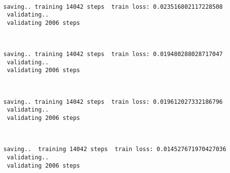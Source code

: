 \documentclass[11pt]{article}
\begin{document}
    \begin{center}
    \end{center}
    { \hspace*{\fill} \\}
    
    \begin{Verbatim}[commandchars=\\\{\}]
 saving.. training 14042 steps  train loss: 0.023516802117228508
 validating..
 validating 2006 steps
    \end{Verbatim}

    \begin{center}
    \end{center}
    { \hspace*{\fill} \\}
    
    \begin{Verbatim}[commandchars=\\\{\}]
 saving.. training 14042 steps  train loss: 0.019480288028717047
 validating..
 validating 2006 steps
    \end{Verbatim}

    \begin{center}
    \end{center}
    { \hspace*{\fill} \\}
    
    \begin{Verbatim}[commandchars=\\\{\}]
 saving.. training 14042 steps  train loss: 0.019612027332186796
 validating..
 validating 2006 steps
    \end{Verbatim}

    \begin{center}
    \end{center}
    { \hspace*{\fill} \\}
    
    \begin{Verbatim}[commandchars=\\\{\}]
 saving..  training 14042 steps  train loss: 0.014527671970427036
 validating..
 validating 2006 steps
    \end{Verbatim}
\end{document}
